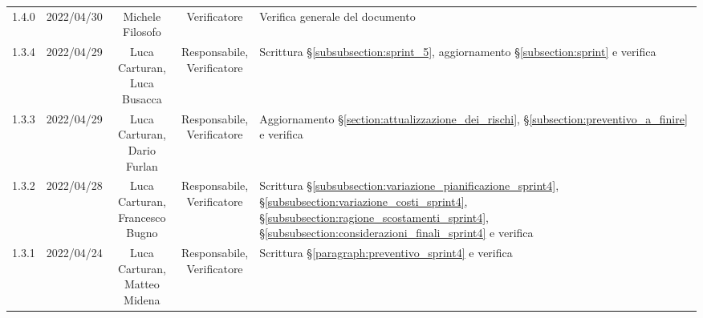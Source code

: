 \begin{center}
\begin{longtable}[c]{c | c | c | c | p{5cm}}
		1.4.0                                                      & 2022/04/30 & Michele Filosofo                       & Verificatore   & Verifica generale del documento                                                                                                           \\
		1.3.4                                                      & 2022/04/29 & \Shortunderstack{Luca Carturan,                                                                                                                                                                     \\Luca Busacca} & \Shortunderstack{Responsabile,\\Verificatore} & Scrittura §\ref{subsubsection:sprint_5}, aggiornamento §\ref{subsection:sprint} e verifica\\
		1.3.3                                                      & 2022/04/29 & \Shortunderstack{Luca Carturan,                                                                                                                                                                     \\Dario Furlan} & \Shortunderstack{Responsabile,\\Verificatore} & Aggiornamento §\ref{section:attualizzazione_dei_rischi}, §\ref{subsection:preventivo_a_finire} e verifica\\
		1.3.2                                                      & 2022/04/28 & \Shortunderstack{Luca Carturan,                                                                                                                                                                     \\Francesco Bugno} & \Shortunderstack{Responsabile,\\Verificatore} & Scrittura §\ref{subsubsection:variazione_pianificazione_sprint4}, §\ref{subsubsection:variazione_costi_sprint4}, §\ref{subsubsection:ragione_scostamenti_sprint4}, §\ref{subsubsection:considerazioni_finali_sprint4} e verifica\\
		1.3.1                                                      & 2022/04/24 & \Shortunderstack{Luca Carturan,                                                                                                                                                                     \\Matteo Midena} & \Shortunderstack{Responsabile,\\Verificatore} & Scrittura §\ref{paragraph:preventivo_sprint4} e verifica\\

\end{longtable}
\end{center}
